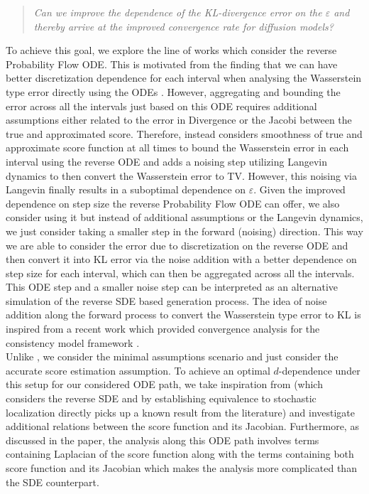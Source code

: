 \documentclass{article}
\begin{document}
\begin{quote}
    \emph{Can we improve the dependence of the KL-divergence error on the $\varepsilon$ and thereby arrive at the improved convergence rate for diffusion models?}
\end{quote}

\noindent
To achieve this goal, we explore the line of works \cite{xu2024provably, gao2024convergence, li2024unified} which consider the reverse Probability Flow ODE. This is motivated from the finding that we can have better discretization dependence for each interval when analysing the Wasserstein type error directly using the ODEs \cite{chen2023probability}.
However, aggregating and bounding the error across all the intervals just based on this ODE requires additional assumptions either related to the error in Divergence \cite{li2024unified} or the Jacobi \cite{li2024d} between the true and approximated score. Therefore, \cite{chen2023probability} instead considers smoothness of true and approximate score function at all times to bound the Wasserstein error in each interval using the reverse ODE and adds a noising step utilizing Langevin dynamics to then convert the Wasserstein error to TV. However, this noising via Langevin finally results in a suboptimal dependence on $\varepsilon$. Given the improved dependence on step size the reverse Probability Flow ODE can offer, we also consider using it but instead of additional assumptions or the Langevin dynamics, we just consider taking a smaller step in the forward (noising) direction. 
This way we are able to consider the error due to discretization on the reverse ODE and then convert it into KL error via the noise addition with a better dependence on step size for each interval, which can then be aggregated across all the intervals. 
This ODE step and a smaller noise step can be interpreted as an alternative simulation of the reverse SDE based generation process. The idea of noise addition along the forward process to convert the Wasserstein type error to KL is inspired from a recent work \cite{jain2025multi} which provided convergence analysis for the consistency model framework \cite{song2023consistency}. \\
Unlike \cite{chen2023probability}, we consider the minimal assumptions scenario  \cite{chen2023improved, benton2023nearly} and just consider the accurate score estimation assumption. To achieve an optimal $d$-dependence under this setup for our considered ODE path, we take inspiration from \cite{benton2023nearly} (which considers the reverse SDE and by establishing equivalence to stochastic localization directly picks up a known result from the literature) and investigate additional relations between the score function and its Jacobian. Furthermore, as discussed in the paper, the analysis along this ODE path involves terms containing Laplacian of the score function along with the terms containing both score function and its Jacobian which makes the analysis more complicated than the SDE counterpart.
\end{document}
